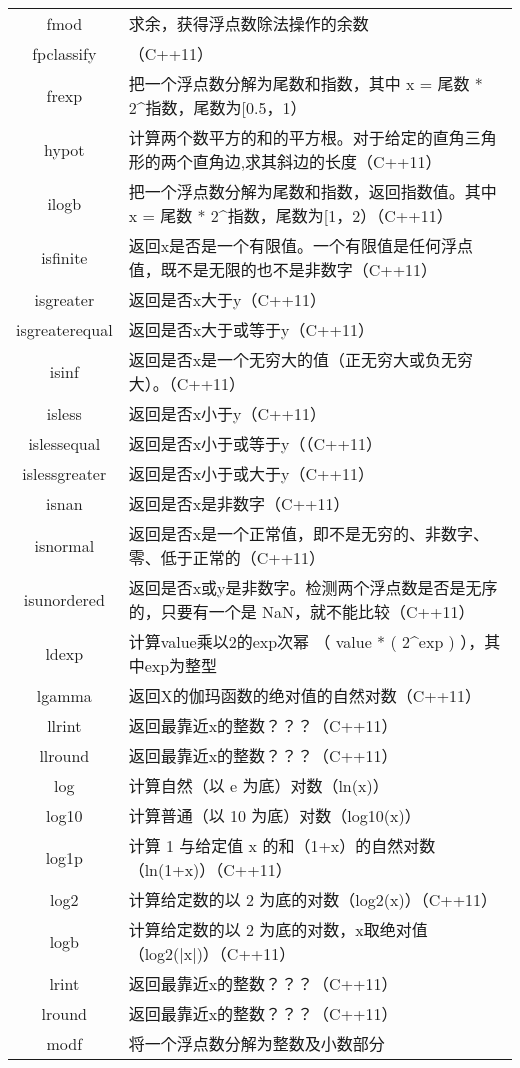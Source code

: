 \documentclass[11pt,a4paper,titlepage]{book}
\begin{document}
\begin{supertabular}{cl}
fmod& 求余，获得浮点数除法操作的余数\\
fpclassify& （C++11）\\
frexp& 把一个浮点数分解为尾数和指数，其中 x = 尾数 * 2\^{}指数，尾数为[0.5，1） \\
hypot& 计算两个数平方的和的平方根。对于给定的直角三角形的两个直角边,求其斜边的长度（C++11）\\
ilogb& 把一个浮点数分解为尾数和指数，返回指数值。其中 x = 尾数 * 2\^{}指数，尾数为[1，2）（C++11）\\
isfinite& 返回x是否是一个有限值。一个有限值是任何浮点值，既不是无限的也不是非数字（C++11）\\
isgreater& 返回是否x大于y（C++11）\\
isgreaterequal& 返回是否x大于或等于y（C++11）\\
isinf& 返回是否x是一个无穷大的值（正无穷大或负无穷大）。（C++11）\\
isless& 返回是否x小于y（C++11）\\
islessequal& 返回是否x小于或等于y（（C++11）\\
islessgreater& 返回是否x小于或大于y（C++11）\\
isnan& 返回是否x是非数字（C++11）\\
isnormal& 返回是否x是一个正常值，即不是无穷的、非数字、零、低于正常的（C++11）\\
isunordered& 返回是否x或y是非数字。检测两个浮点数是否是无序的，只要有一个是 NaN，就不能比较（C++11）\\
ldexp& 计算value乘以2的exp次幂 （ value * ( 2\^{}exp ) ），其中exp为整型\\
lgamma& 返回X的伽玛函数的绝对值的自然对数（C++11）\\
llrint& 返回最靠近x的整数？？？（C++11）\\
llround& 返回最靠近x的整数？？？（C++11）\\
log& 计算自然（以 e 为底）对数（ln(x)）\\
log10& 计算普通（以 10 为底）对数（log10(x)）\\
log1p& 计算 1 与给定值 x 的和（1+x）的自然对数（ln(1+x)）（C++11）\\
log2& 计算给定数的以 2 为底的对数（log2(x)）（C++11）\\
logb& 计算给定数的以 2 为底的对数，x取绝对值（log2(|x|)）（C++11）\\
lrint& 返回最靠近x的整数？？？（C++11）\\
lround& 返回最靠近x的整数？？？（C++11）\\
modf& 将一个浮点数分解为整数及小数部分\\

\end{supertabular}
\end{document}
